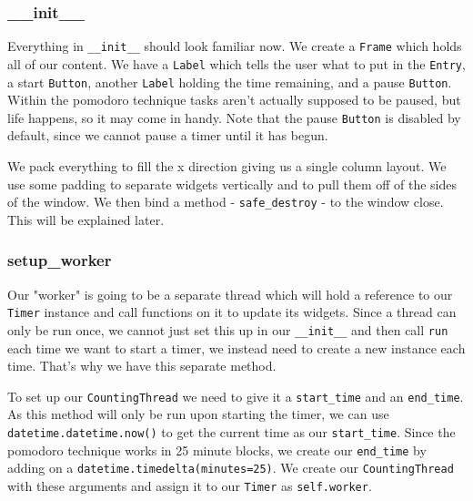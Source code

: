 \documentclass[a4paper,11pt,openany]{book}
\begin{document}
\subsubsection{\_\_init\_\_}

Everything in \lstinline[columns=fixed]{__init__} should look familiar now. We create a \lstinline[columns=fixed]{Frame} which holds all of our content. We have a \lstinline[columns=fixed]{Label} which tells the user what to put in the \lstinline[columns=fixed]{Entry}, a start \lstinline[columns=fixed]{Button}, another \lstinline[columns=fixed]{Label} holding the time remaining, and a pause \lstinline[columns=fixed]{Button}. Within the pomodoro technique tasks aren't actually supposed to be paused, but life happens, so it may come in handy. Note that the pause \lstinline[columns=fixed]{Button} is disabled by default, since we cannot pause a timer until it has begun. 

\vspace{5mm}

We pack everything to fill the x direction giving us a single column layout. We use some padding to separate widgets vertically and to pull them off of the sides of the window. We then bind a method - \lstinline[columns=fixed]{safe_destroy} - to the window close. This will be explained later. 

\subsubsection{setup\_worker}

Our "worker" is going to be a separate thread which will hold a reference to our \lstinline[columns=fixed]{Timer} instance and call functions on it to update its widgets. Since a thread can only be run once, we cannot just set this up in our \lstinline[columns=fixed]{__init__} and then call \lstinline[columns=fixed]{run} each time we want to start a timer, we instead need to create a new instance each time. That's why we have this separate method. 

\vspace{5mm}

To set up our \lstinline[columns=fixed]{CountingThread} we need to give it a \lstinline[columns=fixed]{start_time} and an \lstinline[columns=fixed]{end_time}. As this method will only be run upon starting the timer, we can use \lstinline[columns=fixed]{datetime.datetime.now()} to get the current time as our \lstinline[columns=fixed]{start_time}. Since the pomodoro technique works in 25 minute blocks, we create our \lstinline[columns=fixed]{end_time} by adding on a \lstinline[columns=fixed]{datetime.timedelta(minutes=25)}. We create our \lstinline[columns=fixed]{CountingThread} with these arguments and assign it to our \lstinline[columns=fixed]{Timer} as \lstinline[columns=fixed]{self.worker}.  
\end{document}
